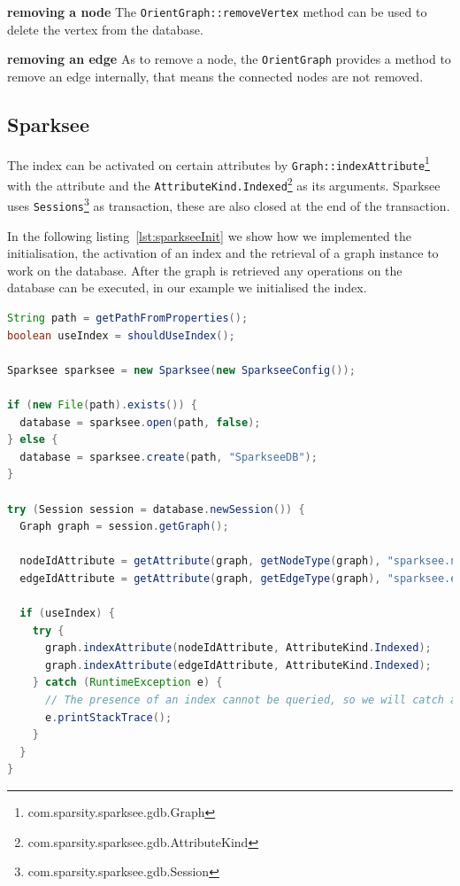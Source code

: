 \textbf{removing a node} \newline
The \texttt{OrientGraph::removeVertex} method can be used to delete the vertex from the database.

\textbf{removing an edge} \newline
As to remove a node,
the \texttt{OrientGraph} provides a method to remove an edge internally,
that means the connected nodes are not removed.

\subsection{Sparksee}
The index can be activated on certain attributes by \texttt{Graph::indexAttribute}\footnote{com.sparsity.sparksee.gdb.Graph} with the attribute and the \texttt{AttributeKind.Indexed}\footnote{com.sparsity.sparksee.gdb.AttributeKind} as its arguments.
Sparksee uses \texttt{Sessions}\footnote{com.sparsity.sparksee.gdb.Session} as transaction,
these are also closed at the end of the transaction.

In the following listing~\ref{lst:sparkseeInit} we show how we implemented the initialisation, the activation of an index and the retrieval of a graph instance to work on the database.
After the graph is retrieved any operations on the database can be executed,
in our example we initialised the index.

\begin{lstlisting}[language=Java,label={lst:sparkseeInit},caption={Implementation of the initialisation and starting of a session.},captionpos=b]
String path = getPathFromProperties();
boolean useIndex = shouldUseIndex();

Sparksee sparksee = new Sparksee(new SparkseeConfig());

if (new File(path).exists()) {
  database = sparksee.open(path, false);
} else {
  database = sparksee.create(path, "SparkseeDB");
}

try (Session session = database.newSession()) {
  Graph graph = session.getGraph();

  nodeIdAttribute = getAttribute(graph, getNodeType(graph), "sparksee.nodeId");
  edgeIdAttribute = getAttribute(graph, getEdgeType(graph), "sparksee.edgeId");

  if (useIndex) {
    try {
      graph.indexAttribute(nodeIdAttribute, AttributeKind.Indexed);
      graph.indexAttribute(edgeIdAttribute, AttributeKind.Indexed);
    } catch (RuntimeException e) {
      // The presence of an index cannot be queried, so we will catch and ignore the exception thrown when an index already exists.
      e.printStackTrace();
    }
  }
}
\end{lstlisting}

